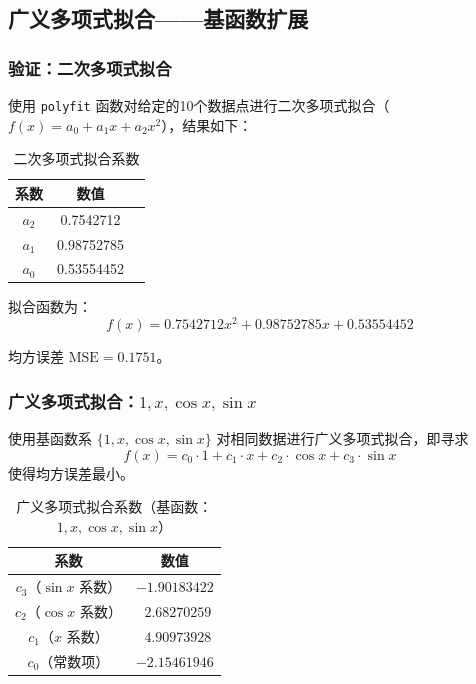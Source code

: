 \documentclass{article}
\begin{document}
\subsection{广义多项式拟合——基函数扩展}

\subsubsection{验证：二次多项式拟合}

使用 \texttt{polyfit} 函数对给定的10个数据点进行二次多项式拟合（$f(x) = a_0 + a_1 x + a_2 x^2$），结果如下：

\begin{table}[h]
\centering
\begin{tabular}{ccc}
\toprule
系数 & 数值 \\
\midrule
$a_2$ & 0.7542712 \\
$a_1$ & 0.98752785 \\
$a_0$ & 0.53554452 \\
\bottomrule
\end{tabular}
\caption{二次多项式拟合系数}
\end{table}

拟合函数为：
\[
f(x) = 0.7542712 x^2 + 0.98752785 x + 0.53554452
\]

均方误差 $\mathrm{MSE} = 0.1751$。

\subsubsection{广义多项式拟合：$1, x, \cos x, \sin x$}

使用基函数系 $\{1, x, \cos x, \sin x\}$ 对相同数据进行广义多项式拟合，即寻求
\[
f(x) = c_0 \cdot 1 + c_1 \cdot x + c_2 \cdot \cos x + c_3 \cdot \sin x
\]
使得均方误差最小。

\begin{table}[h]
\centering
\begin{tabular}{cc}
\toprule
系数 & 数值 \\
\midrule
$c_3$（$\sin x$ 系数） & $-1.90183422$ \\
$c_2$（$\cos x$ 系数） & $\ \ 2.68270259$ \\
$c_1$（$x$ 系数） & $\ \ 4.90973928$ \\
$c_0$（常数项） & $-2.15461946$ \\
\bottomrule
\end{tabular}
\caption{广义多项式拟合系数（基函数：$1, x, \cos x, \sin x$）}
\end{table}
\end{document}
